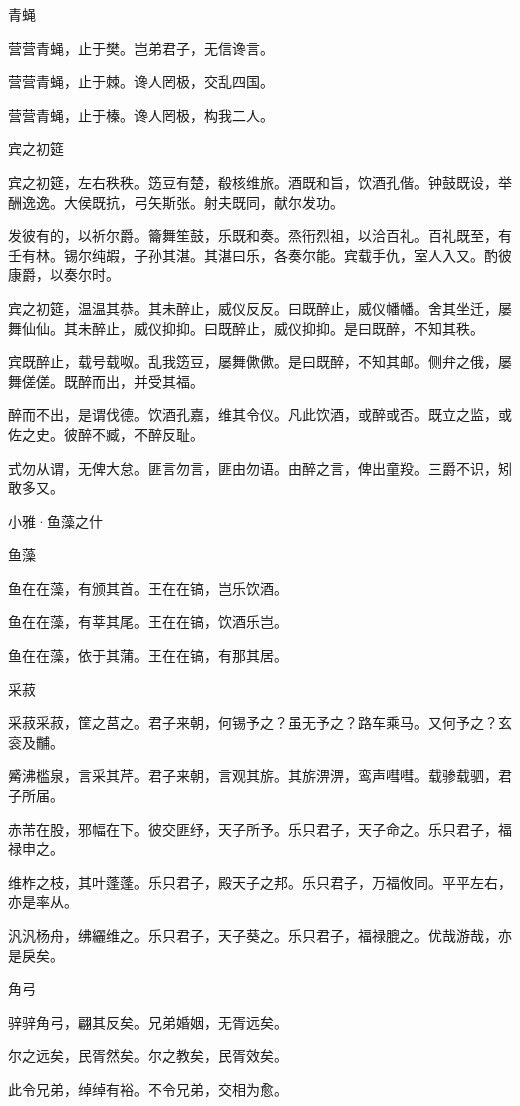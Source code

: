青蝇

营营青蝇，止于樊。岂弟君子，无信谗言。

营营青蝇，止于棘。谗人罔极，交乱四国。

营营青蝇，止于榛。谗人罔极，构我二人。

宾之初筵

宾之初筵，左右秩秩。笾豆有楚，殽核维旅。酒既和旨，饮酒孔偕。钟鼓既设，举酬逸逸。大侯既抗，弓矢斯张。射夫既同，献尔发功。

发彼有的，以祈尔爵。籥舞笙鼓，乐既和奏。烝衎烈祖，以洽百礼。百礼既至，有壬有林。锡尔纯嘏，子孙其湛。其湛曰乐，各奏尔能。宾载手仇，室人入又。酌彼康爵，以奏尔时。

宾之初筵，温温其恭。其未醉止，威仪反反。曰既醉止，威仪幡幡。舍其坐迁，屡舞仙仙。其未醉止，威仪抑抑。曰既醉止，威仪抑抑。是曰既醉，不知其秩。

宾既醉止，载号载呶。乱我笾豆，屡舞僛僛。是曰既醉，不知其邮。侧弁之俄，屡舞傞傞。既醉而出，并受其福。

醉而不出，是谓伐德。饮酒孔嘉，维其令仪。凡此饮酒，或醉或否。既立之监，或佐之史。彼醉不臧，不醉反耻。

式勿从谓，无俾大怠。匪言勿言，匪由勿语。由醉之言，俾出童羖。三爵不识，矧敢多又。




小雅·鱼藻之什


鱼藻

鱼在在藻，有颁其首。王在在镐，岂乐饮酒。

鱼在在藻，有莘其尾。王在在镐，饮酒乐岂。

鱼在在藻，依于其蒲。王在在镐，有那其居。

采菽

采菽采菽，筐之莒之。君子来朝，何锡予之？虽无予之？路车乘马。又何予之？玄衮及黼。

觱沸槛泉，言采其芹。君子来朝，言观其旂。其旂淠淠，鸾声嘒嘒。载骖载驷，君子所届。

赤芾在股，邪幅在下。彼交匪纾，天子所予。乐只君子，天子命之。乐只君子，福禄申之。

维柞之枝，其叶蓬蓬。乐只君子，殿天子之邦。乐只君子，万福攸同。平平左右，亦是率从。

汎汎杨舟，绋纚维之。乐只君子，天子葵之。乐只君子，福禄膍之。优哉游哉，亦是戾矣。

角弓

骍骍角弓，翩其反矣。兄弟婚姻，无胥远矣。

尔之远矣，民胥然矣。尔之教矣，民胥效矣。

此令兄弟，绰绰有裕。不令兄弟，交相为愈。

